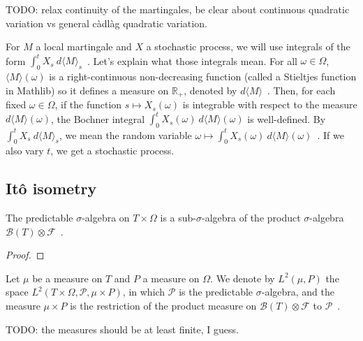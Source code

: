 TODO: relax continuity of the martingales, be clear about continuous quadratic variation vs general càdlàg quadratic variation.

For $M$ a local martingale and $X$ a stochastic process, we will use integrals of the form $\int_0^t X_s \: d\langle M \rangle_s$~.
Let's explain what those integrals mean. For all $\omega \in \Omega$, $\langle M \rangle(\omega)$ is a right-continuous non-decreasing function (called a Stieltjes function in Mathlib) so it defines a measure on $\mathbb{R}_+$, denoted by $d\langle M \rangle$~.
Then, for each fixed $\omega \in \Omega$, if the function $s \mapsto X_s(\omega)$ is integrable with respect to the measure $d\langle M \rangle(\omega)$, the Bochner integral $\int_0^t X_s(\omega) \: d\langle M \rangle(\omega)$ is well-defined.
By $\int_0^t X_s \: d\langle M \rangle_s$, we mean the random variable $\omega \mapsto \int_0^t X_s(\omega) \: d\langle M \rangle(\omega)$~.
If we also vary $t$, we get a stochastic process.



\subsection{Itô isometry}


\begin{lemma}\label{lem:Filtration.predictable_le_prod}
The predictable $\sigma$-algebra on $T \times \Omega$ is a sub-$\sigma$-algebra of the product $\sigma$-algebra $\mathcal{B}(T) \otimes \mathcal{F}$~.
\end{lemma}

\begin{proof}
\end{proof}


\begin{definition}\label{def:L2Predictable}
  \leanok
Let $\mu$ be a measure on $T$ and $P$ a measure on $\Omega$.
We denote by $L^2(\mu, P)$ the space $L^2(T \times \Omega, \mathcal{P}, \mu \times P)$, in which $\mathcal{P}$ is the predictable $\sigma$-algebra, and the measure $\mu \times P$ is the restriction of the product measure on $\mathcal{B}(T) \otimes \mathcal{F}$ to $\mathcal{P}$~.
\end{definition}

TODO: the measures should be at least finite, I guess.

